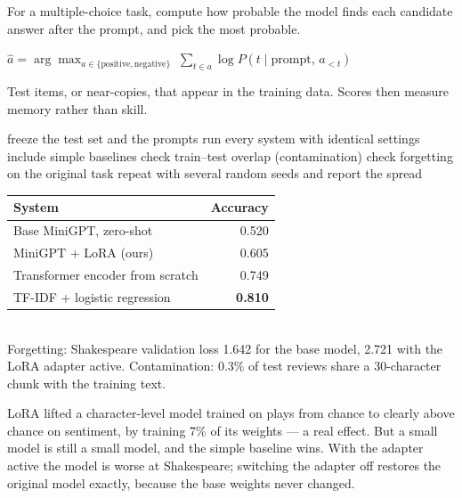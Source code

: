 \documentclass[11pt,a4paper]{article}
\begin{document}

\begin{bdef}
For a multiple-choice task, compute how probable the model finds each candidate answer after the prompt, and pick the most probable.
\end{bdef}
\begin{bmath}[Score]
$\hat a=\arg\max_{a\in\{\text{positive},\text{negative}\}}\;\sum_{t\in a}\log P(t\mid\text{prompt},\,a_{<t})$
\end{bmath}
\begin{bdef}[Contamination]
Test items, or near-copies, that appear in the training data. Scores then measure memory rather than skill.
\end{bdef}
\begin{balgo}
\begin{algorithmic}[1]
\State freeze the test set and the prompts
\State run every system with identical settings
\State include simple baselines
\State check train--test overlap (contamination)
\State check forgetting on the original task
\State repeat with several random seeds and report the spread
\end{algorithmic}
\end{balgo}
\begin{bres}
\begin{tabular}{lr}
\toprule
System & Accuracy\\
\midrule
Base MiniGPT, zero-shot & 0.520\\
MiniGPT + LoRA (ours) & 0.605\\
Transformer encoder from scratch & 0.749\\
TF-IDF + logistic regression & \textbf{0.810}\\
\bottomrule
\end{tabular}\\[3pt]
Forgetting: Shakespeare validation loss 1.642 for the base model, 2.721 with the LoRA adapter active. Contamination: 0.3\% of test reviews share a 30-character chunk with the training text.
\end{bres}
LoRA lifted a character-level model trained on plays from chance to clearly above chance on sentiment, by training 7\% of its weights --- a real effect. But a small model is still a small model, and the simple baseline wins. With the adapter active the model is worse at Shakespeare; switching the adapter off restores the original model exactly, because the base weights never changed.
\end{document}
